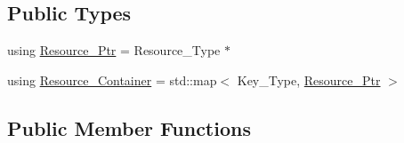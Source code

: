 \subsection*{Public Types}
\begin{DoxyCompactItemize}
\item 
using \mbox{\hyperlink{classec_1_1_resource_registry_aa3069d67662599730165c5d0df3043c9}{Resource\+\_\+\+Ptr}} = Resource\+\_\+\+Type $\ast$
\item 
using \mbox{\hyperlink{classec_1_1_resource_registry_ae87de43830e4ff17a2883ee2f10c368e}{Resource\+\_\+\+Container}} = std\+::map$<$ Key\+\_\+\+Type, \mbox{\hyperlink{classec_1_1_resource_registry_aa3069d67662599730165c5d0df3043c9}{Resource\+\_\+\+Ptr}} $>$
\end{DoxyCompactItemize}
\subsection*{Public Member Functions}
